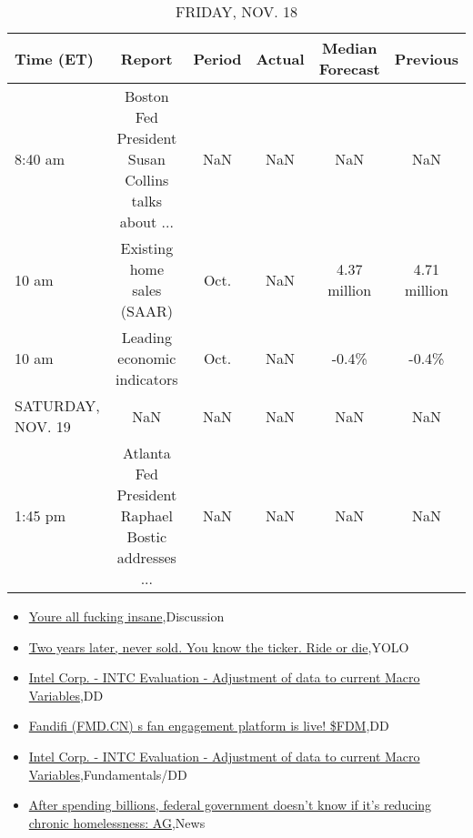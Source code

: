 \documentclass{article}%
\begin{document}
\begin{table}[htbp]%
\caption{FRIDAY, NOV. 18}%
\centering%
\begin{adjustbox}{width=1\textwidth}%
\begin{tabular}{lccccc}
\toprule
        Time (ET) &                                             Report & Period & Actual & Median Forecast &     Previous \\
\midrule
          8:40 am & Boston Fed President Susan Collins talks about ... &    NaN &    NaN &             NaN &          NaN \\
            10 am &                         Existing home sales (SAAR) &   Oct. &    NaN &    4.37 million & 4.71 million \\
            10 am &                        Leading economic indicators &   Oct. &    NaN &           -0.4\% &        -0.4\% \\
SATURDAY, NOV. 19 &                                                NaN &    NaN &    NaN &             NaN &          NaN \\
          1:45 pm & Atlanta Fed President Raphael Bostic addresses ... &    NaN &    NaN &             NaN &          NaN \\
\bottomrule
\end{tabular}
%
\end{adjustbox}%
\end{table}

%
\begin{itemize}%
\item%
\href{https://reddit.com/r/wallstreetbets/comments/ywr33g/youre\_all\_fucking\_insane/}{Youre all fucking insane},Discussion%
\item%
\href{https://reddit.com/r/wallstreetbets/comments/ywr2nw/two\_years\_later\_never\_sold\_you\_know\_the\_ticker/}{Two years later, never sold. You know the ticker. Ride or die},YOLO%
\item%
\href{https://reddit.com/r/wallstreetbets/comments/ywqxgk/intel\_corp\_intc\_evaluation\_adjustment\_of\_data\_to/}{Intel Corp. - INTC Evaluation - Adjustment of data to current Macro Variables},DD%
\item%
\href{https://reddit.com/r/Baystreetbets/comments/ywsjci/fandifi\_fmdcn\_s\_fan\_engagement\_platform\_is\_live/}{Fandifi (FMD.CN) s fan engagement platform is live! \$FDM},DD%
\item%
\href{https://reddit.com/r/StockMarket/comments/ywqwkf/intel\_corp\_intc\_evaluation\_adjustment\_of\_data\_to/}{Intel Corp. - INTC Evaluation - Adjustment of data to current Macro Variables},Fundamentals/DD%
\item%
\href{https://reddit.com/r/Economics/comments/ywngfv/after\_spending\_billions\_federal\_government\_doesnt/}{After spending billions, federal government doesn't know if it's reducing chronic homelessness: AG},News%
\end{itemize}%
\end{document}
